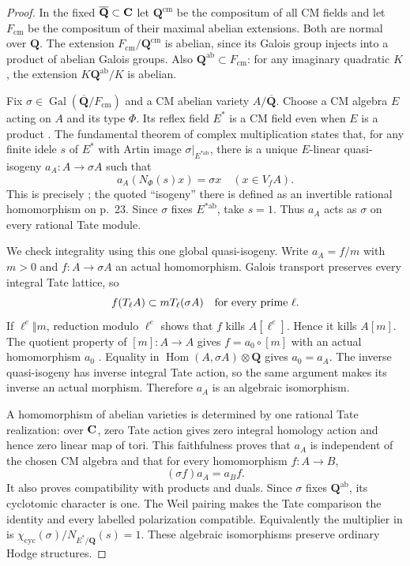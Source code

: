\documentclass[11pt]{article}
\theoremstyle{definition}\newtheorem{definition}[theorem]{Definition}
\theoremstyle{remark}\newtheorem{remark}[theorem]{Remark}
\newcommand{\Q}{\mathbf Q}\newcommand{\Z}{\mathbf Z}
\newcommand{\Qb}{\overline{\mathbf Q}}\newcommand{\Fp}{\mathbf F_p}
\DeclareMathOperator{\Gal}{Gal}\DeclareMathOperator{\im}{im}
\begin{document}
\begin{proof}
In the fixed $\Qb\subset\C$ let $\Q^{\mathrm{cm}}$ be the compositum
of all CM fields and let $F_{\mathrm{cm}}$ be the compositum of their
maximal abelian extensions. Both are normal over $\Q$.
The extension $F_{\mathrm{cm}}/\Q^{\mathrm{cm}}$ is abelian, since its
Galois group injects into a product of abelian Galois groups. Also
$\Q^{\mathrm{ab}}\subset F_{\mathrm{cm}}$: for any imaginary quadratic
$K$, the extension $K\Q^{\mathrm{ab}}/K$ is abelian.

Fix $\sigma\in\Gal(\Qb/F_{\mathrm{cm}})$ and a CM abelian variety
$A/\Qb$. Choose a CM algebra $E$ acting on $A$ and its type $\Phi$.
Its reflex field $E^*$ is a CM field even when $E$ is a product
\cite[Proposition~1.18, p.~14]{MilneCMNotes}. The fundamental theorem
of complex multiplication states that, for any finite idele $s$ of
$E^*$ with Artin image $\sigma|_{E^{*\mathrm{ab}}}$, there is a unique
$E$-linear quasi-isogeny $a_A:A\to\sigma A$ such that
\[
                   a_A(N_\Phi(s)x)=\sigma x\quad(x\in V_f A).
\]
This is precisely \cite[Theorem~9.10, p.~78]{MilneCMNotes}; the quoted
``isogeny'' there is defined as an invertible rational homomorphism
on p.~23. Since $\sigma$ fixes $E^{*\mathrm{ab}}$, take $s=1$.
Thus $a_A$ acts as $\sigma$ on every rational Tate module.

We check integrality using this one global quasi-isogeny. Write
$a_A=f/m$ with $m>0$ and $f:A\to\sigma A$ an actual homomorphism.
Galois transport preserves every integral Tate lattice, so
\[
                  f(T_\ell A)\subset mT_\ell(\sigma A)
                         \quad\hbox{for every prime }\ell.
\]
If $\ell^e\Vert m$, reduction modulo $\ell^e$ shows that $f$ kills
$A[\ell^e]$. Hence it kills $A[m]$. The quotient property of
$[m]:A\to A$ gives $f=a_0\circ[m]$ with an actual homomorphism $a_0$
\cite[Chapter~I, Remark~8.12, p.~39]{MilneAV}. Equality in
$\operatorname{Hom}(A,\sigma A)\otimes\Q$ gives $a_0=a_A$. The inverse quasi-isogeny
has inverse integral Tate action, so the same argument makes its inverse
an actual morphism. Therefore $a_A$ is an algebraic isomorphism.

A homomorphism of abelian varieties is determined by one rational Tate
realization: over $\mathbf C$, zero Tate action gives zero integral homology
action and hence zero linear map of tori. This faithfulness proves that
$a_A$ is independent of the chosen CM algebra and that for every
homomorphism $f:A\to B$,
\[
                    (\sigma f)a_A=a_Bf.
\]
It also proves compatibility with products and duals. Since $\sigma$
fixes $\Q^{\mathrm{ab}}$, its cyclotomic character is one. The Weil
pairing makes the Tate comparison the identity and every labelled
polarization compatible. Equivalently the multiplier in
\cite[Remark~9.11(c), p.~78]{MilneCMNotes} is
$\chi_{\mathrm{cyc}}(\sigma)/N_{E^*/\Q}(s)=1$.
These algebraic isomorphisms preserve ordinary Hodge structures.


\end{proof}
\end{document}
